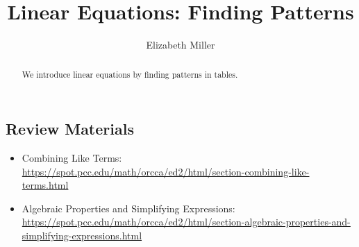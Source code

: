 \documentclass{ximera}
\author{Elizabeth Miller}
\title{Linear Equations: Finding Patterns}
\begin{document}
\begin{abstract}
  We introduce linear equations by finding patterns in tables.
\end{abstract}
\maketitle


\begin{tcolorbox}
\section{Review Materials} 
\begin{itemize}
\item Combining Like Terms: \\ \url{https://spot.pcc.edu/math/orcca/ed2/html/section-combining-like-terms.html}
\item Algebraic Properties and Simplifying Expressions: \\  \url{https://spot.pcc.edu/math/orcca/ed2/html/section-algebraic-properties-and-simplifying-expressions.html}
\end{itemize}
\end{tcolorbox}


\end{document}
